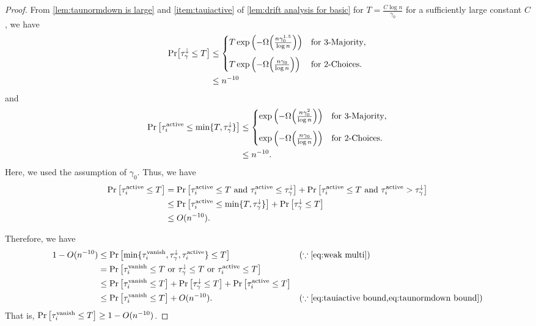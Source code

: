 \documentclass[letterpaper,11pt]{article}
\newcommand{\alphanorm}{\gamma}
\newcommand{\taunormdown}{\tau^{\downarrow}_\alphanorm}
\newcommand{\tauivanish}{\tau^{\mathrm{vanish}}_i}
\newcommand{\tauiactive}{\tau^{\mathrm{active}}_i}
\begin{document}
\begin{proof}
  From \cref{lem:taunormdown is large} and \cref{item:tauiactive} of \cref{lem:drift analysis for basic} for $ T=\frac{C\log n}{\alphanorm_0}$ for a sufficiently large constant $C$, we have
  \begin{align} 
    \Pr[\taunormdown \le T] &\le 
     \begin{cases}
      T\exp\qty(-\Omega\qty(\frac{n\alphanorm_0^{1.5}}{\log n}))	& \text{for 3-Majority},\\[10pt]
      T\exp\qty(-\Omega\qty( \frac{n\alphanorm_0}{\log n} )) & \text{for 2-Choices}.
     \end{cases} \nonumber\\
     &\le n^{-10} \label{eq:taunormdown bound}
  \end{align}
  and
  \begin{align*}
    \Pr\qty[\tauiactive\leq \min\{T,\taunormdown\}]
      &\leq 
      \begin{cases}
          \exp\qty(-\Omega\qty(\frac{n\alphanorm_0^2}{\log n})) & \text{for 3-Majority}, \\[10pt]
          \exp\qty(-\Omega\qty(\frac{n\alphanorm_0}{\log n})) & \text{for 2-Choices}.\\
      \end{cases} \\
      &\le n^{-10}.
  \end{align*}
  Here, we used the assumption of $ \alphanorm_0 $.
  Thus, we have
  \begin{align} 
     \Pr\qty[ \tauiactive \le T ] &= \Pr\qty[ \tauiactive\le T \text{ and }\tauiactive \le \taunormdown ] + \Pr\qty[ \tauiactive\le T \text{ and }\tauiactive > \taunormdown ]  \nonumber\\
     &\le \Pr\qty[ \tauiactive \le \min\{T,\taunormdown\} ] + \Pr\qty[ \taunormdown \le T ] \nonumber\\
     &\le O(n^{-10}). \label{eq:tauiactive bound}
  \end{align}

  Therefore, 
  we have
  \begin{align*} 
     1-O(n^{-10}) &\le \Pr\qty[ \min\{\tauivanish,\taunormdown,\tauiactive\}\le T ] & & (\because\text{\cref{eq:weak multi}}) \\
     &=\Pr\qty[\tauivanish\le T\text{ or }\taunormdown\le T \text{ or }\tauiactive\le T] \\
     &\le \Pr\qty[\tauivanish\le T] + \Pr\qty[\taunormdown\le T] + \Pr\qty[\tauiactive\le T] \\
     &\le \Pr\qty[\tauivanish\le T] + O(n^{-10}). & & (\because\text{\cref{eq:tauiactive bound,eq:taunormdown bound}})
  \end{align*}
  That is, $ \Pr\qty[\tauivanish \le T] \ge 1-O(n^{-10}) $.
\end{proof}
\end{document}
